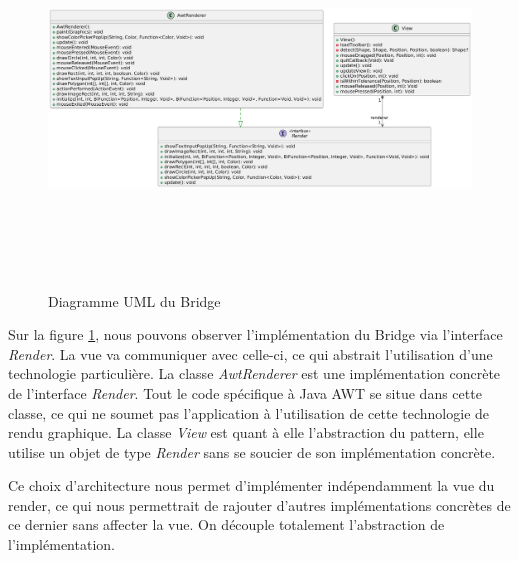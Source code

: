 \documentclass{article}
\begin{document}
\begin{figure}[h]
    \centering
    \includegraphics[width=\textwidth,height=10.0cm,keepaspectratio]{bridge.png}
    \caption{Diagramme UML du Bridge}
    \label{Bridge}
\end{figure}
\FloatBarrier

Sur la figure \ref{Bridge}, nous pouvons observer l'implémentation du Bridge via l'interface \textit{Render}.
La vue va communiquer avec celle-ci, ce qui abstrait l'utilisation d'une technologie particulière.
La classe \textit{AwtRenderer} est une implémentation concrète de l'interface \textit{Render}. 
Tout le code spécifique à Java AWT se situe dans cette classe, ce qui ne soumet pas l'application à
l'utilisation de cette technologie de rendu graphique.
La classe \textit{View} est quant à elle l'abstraction du pattern, elle utilise un objet de type \textit{Render} sans se soucier de son implémentation concrète.

Ce choix d'architecture nous permet d'implémenter indépendamment la vue du render, ce qui nous permettrait de rajouter d'autres
implémentations concrètes de ce dernier sans affecter la vue.
On découple totalement l'abstraction de l'implémentation.
\FloatBarrier
\end{document}
